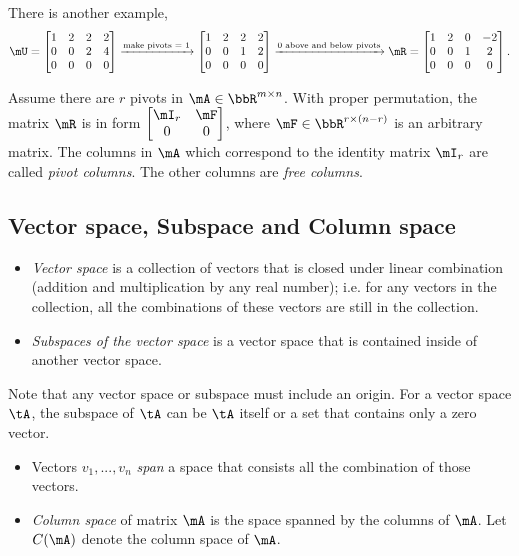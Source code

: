 \documentclass[11pt]{article}
\theoremstyle{plain}
\theoremstyle{definition}
\begin{document}
There is another example,
\begin{align}
	\mU = \begin{bmatrix}
		1 &2&2&2\\0 &0 & 2 & 4\\ 0 & 0 & 0&0
	\end{bmatrix} \xrightarrow{\text{make pivots = 1}} \begin{bmatrix}
		1 &2&2&2\\0 &0 & 1 & 2\\ 0 & 0 & 0&0
	\end{bmatrix} 
	\xrightarrow{\text{0 above and below pivots}} \mR =  \begin{bmatrix}
		1 &2&0&-2\\0 &0 & 1 & 2\\ 0 & 0 & 0&0
	\end{bmatrix} .
\end{align}

Assume there are $r$ pivots in $\mA \in \bbR^{m \times n}$. With proper permutation, the matrix $\mR$ is in form $\begin{bmatrix} \mI_r&\mF\\0 &0	\end{bmatrix}$, where $\mF \in \bbR^{ r \times (n-r)}$ is an arbitrary matrix. The columns in $\mA$ which correspond to the identity matrix $\mI_r$ are called \textit{pivot columns}. The other columns are \textit{free columns}.

\subsection{Vector space, Subspace and Column space}
\begin{itemize}
	\item \textit{Vector space} is a collection of vectors that is closed under linear combination (addition and multiplication by any real number); i.e. for any vectors in the collection, all the combinations of these vectors are still in the collection.
	\item \textit{Subspaces of the vector space} is a vector space that is contained inside of another vector space.
\end{itemize}

Note that any vector space or subspace must include an origin. For a vector space $\tA$, the subspace of $\tA$ can be $\tA$ itself or a set that contains only a zero vector. 

\begin{itemize}
	\item Vectors $v_1 ,...,v_n$ \textit{span} a space that consists all the combination of those vectors. 
	\item \textit{Column space} of matrix $\mA$ is the space spanned by the columns of $\mA$. Let $C(\mA)$ denote the column space of $\mA$.
\end{itemize}
\end{document}
